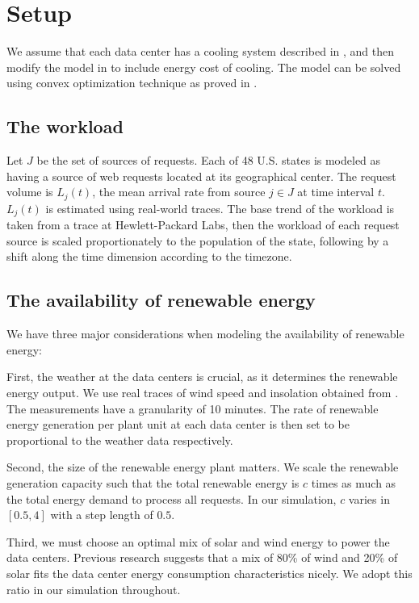 \documentclass{acm_proc_article-sp}
\begin{document}
\section{Setup}
We assume that each data center has a cooling system described in \cite{adam:cooling}, and then modify the model in \cite{adam:GLB} to include energy cost of cooling. The model can be solved using convex optimization technique as proved in \cite{adam:GLBfull}.
\subsection{The workload}
Let $J$ be the set of sources of requests. Each of 48 U.S. states is modeled as having a source of web requests located at its geographical center. The request volume is $L_j(t)$, the mean arrival rate from source $j \in J$ at time interval $t$. $L_j(t)$ is estimated using real-world traces. The base trend of the workload is taken from a trace at Hewlett-Packard Labs, then the workload of each request source is scaled proportionately to the population of the state, following by a shift along the time dimension according to the timezone.

\subsection{The availability of renewable energy}
We have three major considerations when modeling the availability of renewable energy:

First, the weather at the data centers is crucial, as it determines the renewable energy output. We use real traces of wind speed and insolation obtained from \cite{renew1} \cite{renew2}.
The measurements have a granularity of 10 minutes. The rate of renewable energy generation per plant unit at each data center is then set to be proportional to the weather data respectively.

Second, the size of the renewable energy plant matters. We scale the renewable generation capacity such that the total renewable energy is $c$ times as much as the total energy demand to process all requests. In our simulation, $c$ varies in $[0.5, 4]$ with a step length of $0.5$.

Third, we must choose an optimal mix of solar and wind energy to power the data centers. Previous research \cite{adam:GLB} suggests that a mix of 80\% of wind and 20\% of solar fits the data center energy consumption characteristics nicely. We adopt this ratio in our simulation throughout.
\end{document}
